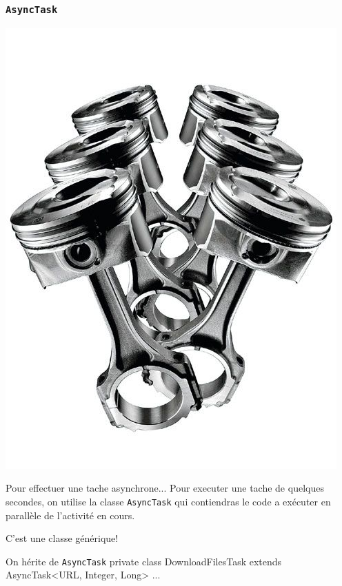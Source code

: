 \documentclass{beamer}
\begin{document}
\begin{frame}
\frametitle{\verb!AsyncTask!}
\begin{center}
\includegraphics[scale=0.07]{async.jpg}
\end{center}
\begin{block}{Pour effectuer une tache asynchrone...}
Pour executer une tache de quelques secondes, on utilise la classe \verb!AsyncTask! qui contiendras le code a exécuter en parallèle de l'activité en cours.
\end{block}
\pause
\begin{block}{}
C'est une classe générique!
\end{block}
\pause
\begin{exampleblock}{On hérite de \verb!AsyncTask!}
 private class DownloadFilesTask extends AsyncTask<URL, Integer, Long> { ... }
\end{exampleblock}
\end{frame}
\end{document}
